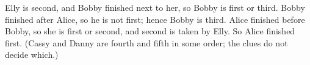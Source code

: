 Elly is second, and Bobby finished next to her, so Bobby is first or third. Bobby finished after Alice, so he is not first; hence Bobby is third. Alice finished before Bobby, so she is first or second, and second is taken by Elly. So $\boxed{\text{Alice}}$ finished first. (Cassy and Danny are fourth and fifth in some order; the clues do not decide which.)
